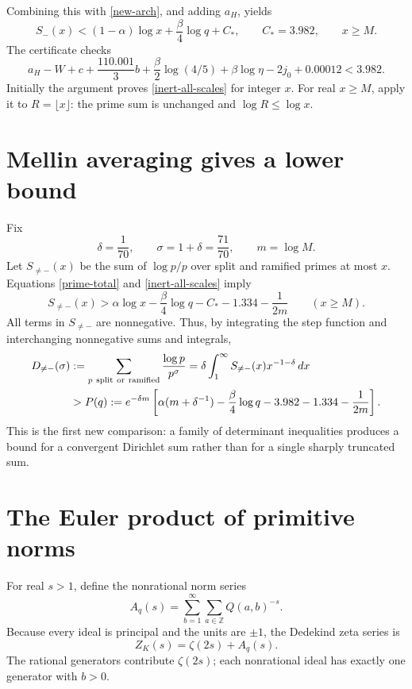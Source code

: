 \documentclass[11pt]{article}
\newcommand{\Z}{\mathbb Z}
\begin{document}
Combining this with \eqref{new-arch}, and adding \(a_H\), yields
\begin{equation}\label{inert-all-scales}
 S_-(x)<(1-\alpha)\log x+\frac{\beta}{4}\log q+C_*,
 \qquad C_*=3.982,\qquad x\ge M.
\end{equation}
The certificate checks
\[
 a_H-W+c+\frac{110.001}{3}b+
 \frac{\beta}{2}\log(4/5)+\beta\log\eta-2j_0+0.00012<3.982.
\]
Initially the argument proves \eqref{inert-all-scales} for integer \(x\).
For real \(x\ge M\), apply it to \(R=\lfloor x\rfloor\): the prime
sum is unchanged and \(\log R\le\log x\).

\section{Mellin averaging gives a lower bound}\label{mellin}

Fix
\[
 \delta=\frac1{70},\qquad \sigma=1+\delta=\frac{71}{70},
 \qquad m=\log M.
\]
Let \(S_{\ne-}(x)\) be the sum of \(\log p/p\) over split and ramified
primes at most \(x\). Equations \eqref{prime-total} and
\eqref{inert-all-scales} imply
\[
 S_{\ne-}(x)>
 \alpha\log x-\frac{\beta}{4}\log q-C_*-1.334-\frac1{2m}
 \qquad(x\ge M).
\]
All terms in \(S_{\ne-}\) are nonnegative. Thus, by integrating the
step function and interchanging nonnegative sums and integrals,
\begin{align}
 D_{\ne-}(\sigma)
 &:=\sum_{p\ {\rm split\ or\ ramified}}\frac{\log p}{p^\sigma}
 =\delta\int_1^\infty S_{\ne-}(x)x^{-1-\delta}\,dx \nonumber\\
 &>P(q):=e^{-\delta m}\left[
 \alpha(m+\delta^{-1})-\frac{\beta}{4}\log q
 -3.982-1.334-\frac1{2m}\right].\label{mellin-lower}
\end{align}
This is the first new comparison: a family of determinant inequalities
produces a bound for a convergent Dirichlet sum rather than for a
single sharply truncated sum.

\section{The Euler product of primitive norms}\label{euler}

For real \(s>1\), define the nonrational norm series
\[
 A_q(s)=\sum_{b=1}^{\infty}\sum_{a\in\Z}Q(a,b)^{-s}.
\]
Because every ideal is principal and the units are \(\pm1\), the
Dedekind zeta series is
\[
 Z_K(s)=\zeta(2s)+A_q(s).
\]
The rational generators contribute \(\zeta(2s)\); each nonrational
ideal has exactly one generator with \(b>0\).
\end{document}
